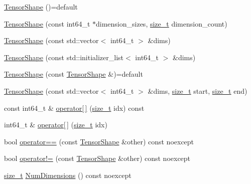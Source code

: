 \begin{DoxyCompactItemize}
\item 
\mbox{\hyperlink{classonnxruntime_1_1TensorShape_a6ef240d824ddcd9e45c720fe70b84d3c}{Tensor\+Shape}} ()=default
\item 
\mbox{\hyperlink{classonnxruntime_1_1TensorShape_a0e4795044253526b2c86a00d2d123c16}{Tensor\+Shape}} (const int64\+\_\+t $\ast$dimension\+\_\+sizes, \mbox{\hyperlink{mlasi_8h_a503efbc1c6e50825320ad909366b78ab}{size\+\_\+t}} dimension\+\_\+count)
\item 
\mbox{\hyperlink{classonnxruntime_1_1TensorShape_adda04711ceba341a94da2438c82b71c4}{Tensor\+Shape}} (const std\+::vector$<$ int64\+\_\+t $>$ \&dims)
\item 
\mbox{\hyperlink{classonnxruntime_1_1TensorShape_ae7570bd5cad2f166f98500ba03210f7e}{Tensor\+Shape}} (const std\+::initializer\+\_\+list$<$ int64\+\_\+t $>$ \&dims)
\item 
\mbox{\hyperlink{classonnxruntime_1_1TensorShape_a2c8f0b8703f40eff16e086b43138d8aa}{Tensor\+Shape}} (const \mbox{\hyperlink{classonnxruntime_1_1TensorShape}{Tensor\+Shape}} \&)=default
\item 
\mbox{\hyperlink{classonnxruntime_1_1TensorShape_a4ae80dbb6c8da7a2cb796d25c0e5bf4d}{Tensor\+Shape}} (const std\+::vector$<$ int64\+\_\+t $>$ \&dims, \mbox{\hyperlink{mlasi_8h_a503efbc1c6e50825320ad909366b78ab}{size\+\_\+t}} start, \mbox{\hyperlink{mlasi_8h_a503efbc1c6e50825320ad909366b78ab}{size\+\_\+t}} end)
\item 
const int64\+\_\+t \& \mbox{\hyperlink{classonnxruntime_1_1TensorShape_ad1bec011064e3c4bcc139327decfd537}{operator\mbox{[}$\,$\mbox{]}}} (\mbox{\hyperlink{mlasi_8h_a503efbc1c6e50825320ad909366b78ab}{size\+\_\+t}} idx) const
\item 
int64\+\_\+t \& \mbox{\hyperlink{classonnxruntime_1_1TensorShape_a49b51462f8cd8942887641a01fbe300b}{operator\mbox{[}$\,$\mbox{]}}} (\mbox{\hyperlink{mlasi_8h_a503efbc1c6e50825320ad909366b78ab}{size\+\_\+t}} idx)
\item 
bool \mbox{\hyperlink{classonnxruntime_1_1TensorShape_ad88c9c2b880bbcf1fc1116993f4dee36}{operator==}} (const \mbox{\hyperlink{classonnxruntime_1_1TensorShape}{Tensor\+Shape}} \&other) const noexcept
\item 
bool \mbox{\hyperlink{classonnxruntime_1_1TensorShape_a5adff36f4e3efc2e2b337a2e78210256}{operator!=}} (const \mbox{\hyperlink{classonnxruntime_1_1TensorShape}{Tensor\+Shape}} \&other) const noexcept
\item 
\mbox{\hyperlink{mlasi_8h_a503efbc1c6e50825320ad909366b78ab}{size\+\_\+t}} \mbox{\hyperlink{classonnxruntime_1_1TensorShape_af9e40196654d3d161544789f61415c53}{Num\+Dimensions}} () const noexcept

\end{DoxyCompactItemize}
